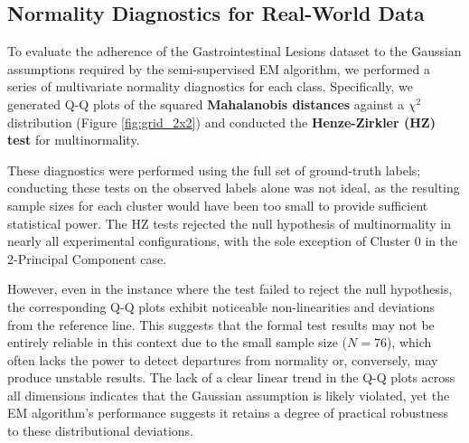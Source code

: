 \documentclass[11pt, a4paper]{article}
\begin{document}
\subsection{Normality Diagnostics for Real-World Data}

To evaluate the adherence of the Gastrointestinal Lesions dataset to the Gaussian assumptions 
required by the semi-supervised EM algorithm, we performed a series of multivariate normality 
diagnostics for each class. Specifically, we generated Q-Q plots of the squared 
\textbf{Mahalanobis distances} against a $\chi^2$ distribution (Figure \ref{fig:grid_2x2}) 
and conducted the \textbf{Henze-Zirkler (HZ) test} for multinormality. 

These diagnostics were performed using the full set of ground-truth labels; conducting these 
tests on the observed labels alone was not ideal, as the resulting sample sizes for 
each cluster would have been too small to provide sufficient statistical power. The HZ tests 
rejected the null hypothesis of multinormality in nearly all experimental configurations, with 
the sole exception of Cluster 0 in the 2-Principal Component case. 

However, even in the instance where the test failed to reject the null hypothesis, 
the corresponding Q-Q plots exhibit noticeable non-linearities and deviations 
from the reference line. This suggests that the formal test results may not be 
entirely reliable in this context due to the small sample size ($N=76$), which often 
lacks the power to detect departures from normality or, conversely, may produce unstable 
results. The lack of a clear linear trend in the Q-Q plots across all dimensions indicates 
that the Gaussian assumption is likely violated, yet the EM algorithm's performance suggests 
it retains a degree of practical robustness to these distributional deviations.
\end{document}
